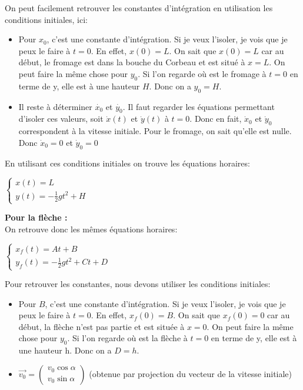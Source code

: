 \documentclass[a4paper,10pt,twoside]{article}
\begin{document}
\begin{enumerate}
    On peut facilement retrouver les constantes d'intégration en utilisation les conditions initiales, ici:
    \begin{itemize}
        \item Pour $x_0$, c'est une constante d'intégration. Si je veux l'isoler, je vois que je peux le faire à $t=0$. En effet, $x(0)=L$. On sait que $x(0)=L$ car au début, le fromage est dans la bouche du Corbeau et est situé à $x=L$. On peut faire la même chose pour $y_0$. Si l'on regarde où est le fromage à $t=0$ en terme de y, elle est à une hauteur $H$. Donc on a $y_0=H$.
        \item Il reste à déterminer $\dot{x_0}$ et $\dot{y_0}$. Il faut regarder les équations permettant d'isoler ces valeurs, soit $\dot{x}(t)$ et $\dot{y}(t)$ à $t=0$. Donc en fait, $\dot{x}_0$ et $\dot{y}_0$ correspondent à la vitesse initiale. Pour le fromage, on sait qu'elle est nulle. Donc $\dot{x}_0=0$ et $\dot{y}_0=0$
    \end{itemize}
    
    En utilisant ces conditions initiales on trouve les équations horaires:
    \begin{center}
    $
        \begin{cases}
         x(t) = L \\
        y(t) = -\frac{1}{2}gt^2 + H
        \end{cases}
        $
    \end{center}
    
 
    
    \textbf{Pour la flèche : } \\
    On retrouve donc les mêmes équations horaires: 
    
     \begin{center}
        $\begin{cases}
        x_f(t) = At + B \\
        y_f(t) = -\frac{1}{2}gt^2 + Ct + D
        \end{cases}$
    \end{center}
    
    Pour retrouver les constantes, nous devons utiliser les conditions initiales: 
    \begin{itemize}
        \item Pour $B$, c'est une constante d'intégration. Si je veux l'isoler, je vois que je peux le faire à $t=0$. En effet, $x_f(0)=B$. On sait que $x_f(0)=0$ car au début, la flèche n'est pas partie et est située à $x=0$. On peut faire la même chose pour $y_0$. Si l'on regarde où est la flèche à $t=0$ en terme de y, elle est à une hauteur h. Donc on a $D=h$.
        \item $\vec{v_0} = 
    \begin{pmatrix} 
    v_0 \cos{\alpha}\\
    v_0 \sin{\alpha}
    \end{pmatrix}$ (obtenue par projection du vecteur de la vitesse initiale)
    \end{itemize}
    

\end{enumerate}
\end{document}

